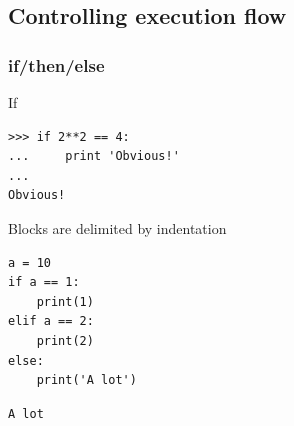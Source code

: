 \documentclass[colorlinks]{beamer}
\begin{document}
\subsection{Controlling execution flow}
\begin{frame}[fragile]\frametitle{if/then/else}
\begin{block}{If}
\tiny
\begin{verbatim}
>>> if 2**2 == 4:
...     print 'Obvious!'
... 
Obvious!
\end{verbatim}


\end{block}
\begin{block}{Blocks are delimited by indentation}
\tiny
\begin{verbatim}
a = 10
if a == 1:
    print(1)
elif a == 2:
    print(2)
else:
    print('A lot')

\end{verbatim}
\begin{verbatim}
A lot
\end{verbatim}

\end{block}
\end{frame}
\end{document}
